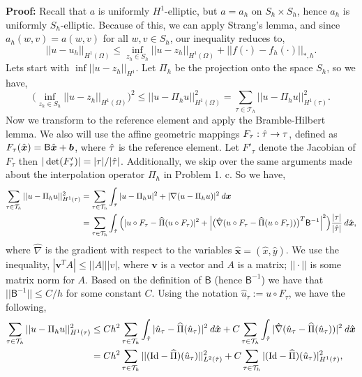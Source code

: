 \documentclass[11pt]{article}
\newcommand{\bs}{\boldsymbol}
\begin{document}
\textbf{Proof:} Recall that $a$ is uniformly $H^1$-elliptic, but $a = a_h$ on $S_h\times S_h$, hence $a_h$ is uniformly $S_h$-elliptic.
Because of this, we can apply Strang's lemma, and since $a_h(w,v) = a(w,v)$ for all $w,v \in S_h$, our inequality reduces to,
\begin{equation*}
    ||u - u_h||_{H^1(\Omega)} \leq \inf_{z_h \in S_h} ||u - z_h||_{H^1(\Omega)} + ||f(\cdot) - f_h(\cdot)||_{*,h}.
\end{equation*}
Lets start with $\inf ||u - z_h||_{H^1}$.
Let $\Pi_h$ be the projection onto the space $S_h$, so we have,
\begin{equation*}
    \big(\inf_{z_h \in S_h} ||u - z_h||_{H^1(\Omega)}\big)^2 \leq ||u - \Pi_h u ||_{H^1(\Omega)}^2 = \sum_{\tau \in \mathcal{T}_h} ||u - \Pi_h u||^2_{H^1(\tau)}.
\end{equation*}
Now we transform to the reference element and apply the Bramble-Hilbert lemma.
We also will use the affine geometric mappings $F_\tau : \Hat{\tau} \to \tau$, defined as $F_\tau(\Hat{\bs{x}}) = \mathsf{B}\Hat{\bs{x}} + \bs{b}$, where $\Hat{\tau}$ is the reference element.
Let $F'_\tau$ denote the Jacobian of $F_\tau$ then $|\det(F'_\tau)| = |\tau|/|\Hat{\tau}|$.
Additionally, we skip over the same arguments made about the interpolation operator $\Pi_h$ in Problem 1. c.
So we have,
\begin{align*}
	\sum_{\tau \in \mathcal{T}_h} ||u - \Pi_h u||^2_{H^1(\tau)} &= \sum_{\tau \in \mathcal{T}_h} \int_{\tau} |u - \Pi_h u|^2 + |\nabla(u - \Pi_h u)|^2 \: d\bs{x} \\
	&= \sum_{\tau \in \mathcal{T}_h} \int_{\Hat{\tau}} \Big( |u\circ F_\tau  - \widehat{\Pi} (u\circ F_\tau) |^2 + \Big| \big(\Hat{\nabla} (u\circ F_\tau - \widehat{\Pi}(u\circ F_\tau))\big)^T \mathsf{B}^{-1} \Big|^2 \Big) \frac{|\tau|}{|\Hat{\tau}|} \: d\Hat{\bs{x}},
\end{align*}
where $\hat{\nabla}$ is the gradient with respect to the variables $\hat{\bs{x}} = (\hat{x},\hat{y})$.
We use the inequality, $|\boldsymbol{v}^T A| \leq ||A|||v|$, where $\boldsymbol{v}$ is a vector and $A$ is a matrix; $||\cdot||$ is some matrix norm for $A$. 
Based on the definition of $\mathsf{B}$ (hence $\mathsf{B}^{-1}$) we have that $||\mathsf{B}^{-1}|| \leq C/h$ for some constant $C$.
Using the notation $\hat{u}_\tau := u \circ F_\tau$, we have the following,
\begin{align*}
	\sum_{\tau \in \mathcal{T}_h} ||u - \Pi_h u||^2_{H^1(\tau)} &\leq Ch^2 \sum_{\tau \in \mathcal{T}_h} \int_{\Hat{\tau}} |\hat{u}_\tau - \widehat{\Pi}(\hat{u}_\tau)|^2 \: d\Hat{\bs{x}} + C \sum_{\tau \in \mathcal{T}_h} \int_{\Hat{\tau}} |\Hat{\nabla}(\hat{u}_\tau - \widehat{\Pi}(\hat{u}_\tau))|^2 \: d\Hat{\bs{x}} \\
	&= Ch^2 \sum_{\tau \in \mathcal{T}_h} ||(\text{Id} - \widehat{\Pi})(\hat{u}_\tau)||^2_{L^2(\Hat{\tau})} + C \sum_{\tau \in \mathcal{T}_h} |(\text{Id} - \widehat{\Pi})(\hat{u}_\tau)|^2_{H^1(\Hat{\tau})},
\end{align*}
\end{document}
